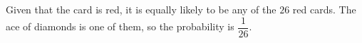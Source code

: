 Given that the card is red, it is equally likely to be any of the $26$ red cards. The ace of diamonds is one of them, so the probability is $\boxed{\dfrac{1}{26}}$.
